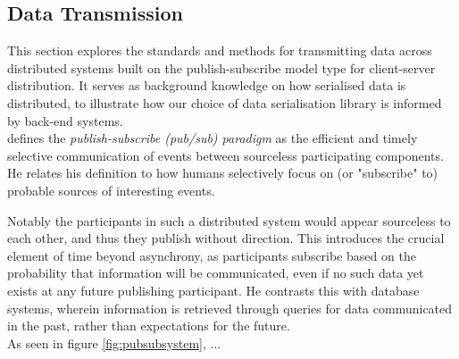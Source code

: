 \documentclass[../report.tex]{subfiles}
\begin{document}


\subsection{Data Transmission} %

This section explores the standards and methods for transmitting data across distributed systems built on the publish-subscribe model type for client-server distribution. It serves as background knowledge on how serialised data is distributed, to illustrate how our choice of data serialisation library is informed by back-end systems. \\

\cite{tarkoma2012publish} defines the \textit{publish-subscribe (pub/sub) paradigm} as the efficient and timely selective communication of events between sourceless participating components. He relates his definition to how humans selectively focus on (or "subscribe" to) probable sources of interesting events.

Notably the participants in such a distributed system would appear sourceless to each other, and thus they publish without direction. This introduces the crucial element of time beyond asynchrony, as participants subscribe based on the probability that information will be communicated, even if no such data yet exists at any future publishing participant. He contrasts this with database systems, wherein information is retrieved through queries for data communicated in the past, rather than expectations for the future. \\

As seen in figure \ref{fig:pubsubsystem}, ...
\end{document}

